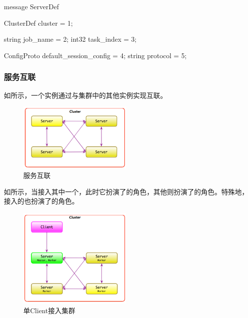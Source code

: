\begin{content}
\begin{leftbar}
\begin{python}
message ServerDef {
  ClusterDef cluster = 1;
  
  string job_name = 2;
  int32 task_index = 3;

  ConfigProto default_session_config = 4;
  string protocol = 5;
}
\end{python}
\end{leftbar}

\subsubsection{服务互联}

如所示，一个实例通过与集群中的其他实例实现互联。

\begin{figure}[H]
\centering
\includegraphics[width=0.5\textwidth]{figures/cc-server-interact.png}
\caption{服务互联}
 \label{fig:cc-server-interact}
\end{figure}

如所示，当接入其中一个，此时它扮演了的角色，其他则扮演了的角色。特殊地，接入的也扮演了的角色。

\begin{figure}[H]
\centering
\includegraphics[width=0.5\textwidth]{figures/cc-server-interact-1.png}
\caption{单Client接入集群}
 \label{fig:cc-server-interact-1}
\end{figure}


\end{content}
